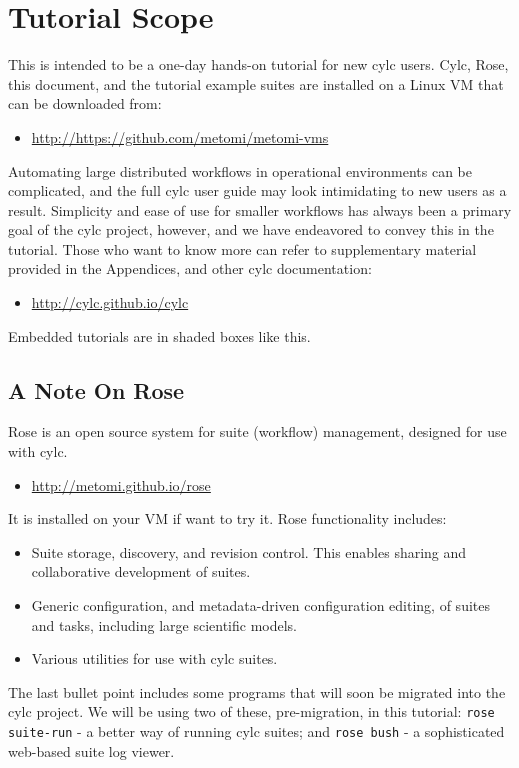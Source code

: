 \section{Tutorial Scope}

This is intended to be a one-day hands-on tutorial for new cylc users.  Cylc,
Rose, this document, and the tutorial example suites are installed on a
Linux VM that can be downloaded from:
\begin{itemize}
    \item \url{http://https://github.com/metomi/metomi-vms}
\end{itemize}

Automating large distributed workflows in operational environments can be
complicated, and the full cylc user guide may look intimidating to new users as
a result.  Simplicity and ease of use for smaller workflows has always been a
primary goal of the cylc project, however, and we have endeavored to convey
this in the tutorial. Those who want to know more can refer to supplementary
material provided in the Appendices, and other cylc documentation:

\begin{itemize}
    \item \url{http://cylc.github.io/cylc}
\end{itemize}



\begin{shaded*}
Embedded tutorials are in shaded boxes like this.
\end{shaded*}

\subsection{A Note On Rose}

Rose is an open source system for suite (workflow) management, designed for use
with cylc.
\begin{itemize}
     \item \url{http://metomi.github.io/rose}
\end{itemize}
 
It is installed on your VM if want to try it.  Rose functionality
includes:
\begin{itemize}
    \item Suite storage, discovery, and revision control.  This enables sharing
        and collaborative development of suites.
    \item Generic configuration, and metadata-driven configuration editing, of
        suites and tasks, including large scientific models.
    \item Various utilities for use with cylc suites.
\end{itemize}

The last bullet point includes some programs that will soon be migrated into
the cylc project.  We will be using two of these, pre-migration, in this
tutorial: \lstinline{rose suite-run} - a better way of running cylc suites; and
\lstinline{rose bush} - a sophisticated web-based suite log viewer.
